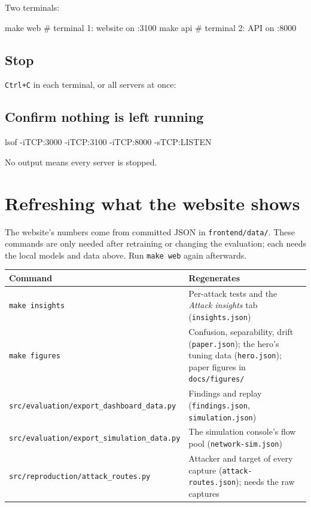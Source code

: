 \documentclass[11pt, a4paper]{article}
\newcommand{\fpath}[1]{\texttt{\small #1}}
\begin{document}
Two terminals:

\begin{cmd}
make web      # terminal 1: website on :3100
make api      # terminal 2: API on :8000
\end{cmd}

\subsection{Stop}

\texttt{Ctrl+C} in each terminal, or all servers at once:


\subsection{Confirm nothing is left running}

\begin{cmd}
lsof -iTCP:3000 -iTCP:3100 -iTCP:8000 -sTCP:LISTEN
\end{cmd}

No output means every server is stopped.

\section{Refreshing what the website shows}

The website's numbers come from committed JSON in \fpath{frontend/data/}. These
commands are only needed after retraining or changing the evaluation; each needs
the local models and data above. Run \texttt{make web} again afterwards.

\begin{center}
\small
\begin{tabularx}{\textwidth}{lX}
\toprule
\textbf{Command} & \textbf{Regenerates} \\
\midrule
\texttt{make insights} & Per-attack tests and the \emph{Attack insights} tab (\fpath{insights.json}) \\
\texttt{make figures}  & Confusion, separability, drift (\fpath{paper.json}); the hero's tuning data (\fpath{hero.json}); paper figures in \fpath{docs/figures/} \\
\fpath{src/evaluation/export\_dashboard\_data.py}   & Findings and replay (\fpath{findings.json}, \fpath{simulation.json}) \\
\fpath{src/evaluation/export\_simulation\_data.py}  & The simulation console's flow pool (\fpath{network-sim.json}) \\
\fpath{src/reproduction/attack\_routes.py}          & Attacker and target of every capture (\fpath{attack-routes.json}); needs the raw captures \\
\bottomrule
\end{tabularx}
\end{center}
\end{document}
